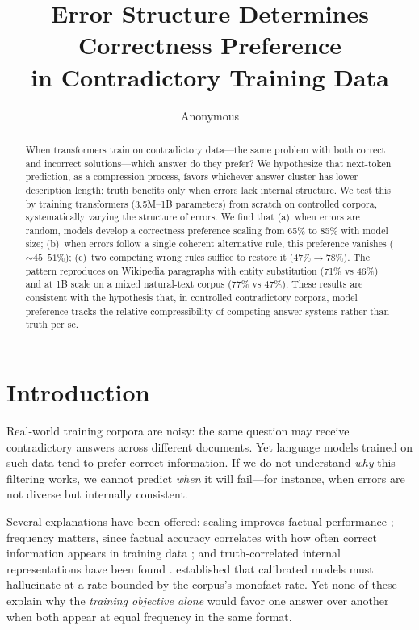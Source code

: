 \documentclass{article}
\title{Error Structure Determines Correctness Preference\\in Contradictory Training Data}
\author{Anonymous}
\date{}
\begin{document}
\maketitle

\begin{abstract}
When transformers train on contradictory data---the same problem with both correct and incorrect solutions---which answer do they prefer? We hypothesize that next-token prediction, as a compression process, favors whichever answer cluster has lower description length; truth benefits only when errors lack internal structure. We test this by training transformers (3.5M--1B parameters) from scratch on controlled corpora, systematically varying the structure of errors. We find that (a)~when errors are random, models develop a correctness preference scaling from 65\% to 85\% with model size; (b)~when errors follow a single coherent alternative rule, this preference vanishes (${\sim}45$--$51\%$); (c)~two competing wrong rules suffice to restore it ($47\% \to 78\%$). The pattern reproduces on Wikipedia paragraphs with entity substitution (71\% vs 46\%) and at 1B scale on a mixed natural-text corpus (77\% vs 47\%). These results are consistent with the hypothesis that, in controlled contradictory corpora, model preference tracks the relative compressibility of competing answer systems rather than truth per se.
\end{abstract}

\section{Introduction}

Real-world training corpora are noisy: the same question may receive contradictory answers across different documents. Yet language models trained on such data tend to prefer correct information. If we do not understand \emph{why} this filtering works, we cannot predict \emph{when} it will fail---for instance, when errors are not diverse but internally consistent.

Several explanations have been offered: scaling improves factual performance \citep{kadavath2022language}; frequency matters, since factual accuracy correlates with how often correct information appears in training data \citep{elazar2022measuring,joshi2024personas,kandpal2023large}; and truth-correlated internal representations have been found \citep{burns2023discovering,marks2024geometry,burger2024truth}. \citet{kalai2024calibrated} established that calibrated models must hallucinate at a rate bounded by the corpus's monofact rate. Yet none of these explain why the \emph{training objective alone} would favor one answer over another when both appear at equal frequency in the same format.
\end{document}
